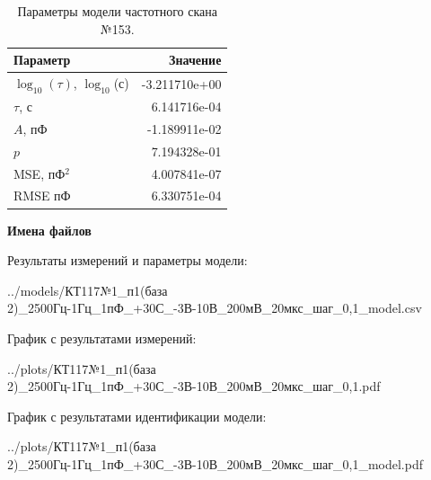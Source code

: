 \begin{table}[!ht]
    \centering
    \caption{Параметры модели частотного скана №153.}
    \begin{tabular}{|l|r|}
        \hline
        Параметр                                       & Значение                  \\ \hline
        $\log_{10}(\tau)$, $\log_{10}$(с)              & -3.211710e+00             \\ \hline
        $\tau$, с                                      & 6.141716e-04              \\ \hline
        $A$, пФ                                        & -1.189911e-02             \\ \hline
        $p$                                            & 7.194328e-01              \\ \hline
        MSE, пФ$^2$                                    & 4.007841e-07              \\ \hline
        RMSE пФ                                        & 6.330751e-04              \\ \hline
    \end{tabular}
    \label{table:frequency_scan_model_153}
\end{table}

\textbf{Имена файлов}

Результаты измерений и параметры модели:

\scriptsize../models/КТ117№1\_п1(база 2)\_2500Гц-1Гц\_1пФ\_+30С\_-3В-10В\_200мВ\_20мкс\_шаг\_0,1\_model.csv
\normalsize

График с результатами измерений:

\scriptsize../plots/КТ117№1\_п1(база 2)\_2500Гц-1Гц\_1пФ\_+30С\_-3В-10В\_200мВ\_20мкс\_шаг\_0,1.pdf
\normalsize

График с результатами идентификации модели:

\scriptsize../plots/КТ117№1\_п1(база 2)\_2500Гц-1Гц\_1пФ\_+30С\_-3В-10В\_200мВ\_20мкс\_шаг\_0,1\_model.pdf
\normalsize

